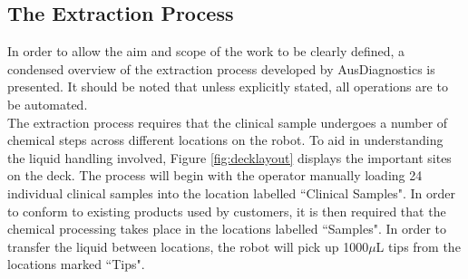 \subsection{The Extraction Process}
\label{subsec:intro_extraction}

In order to allow the aim and scope of the work to be clearly defined, a condensed overview of the extraction process developed by AusDiagnostics is presented. It should be noted that unless explicitly stated, all operations are to be automated.\\

The extraction process requires that the clinical sample undergoes a number of chemical steps across different locations on the robot. To aid in understanding the liquid handling involved, Figure \ref{fig:decklayout} displays the important sites on the deck. The process will begin with the operator manually loading 24 individual clinical samples into the location labelled ``Clinical Samples". In order to conform to existing products used by customers, it is then required that the chemical processing takes place in the locations labelled ``Samples". In order to transfer the liquid between locations, the robot will pick up 1000$\mu$L tips from the locations marked ``Tips".\\

